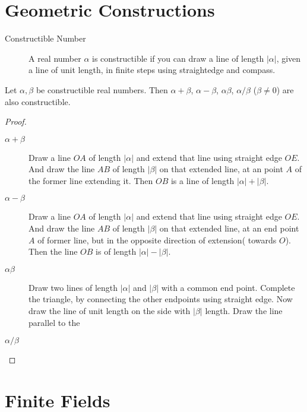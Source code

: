 \section{Geometric Constructions}
\begin{description}
	\item[Constructible Number] A real number $\alpha$ is constructible if you can draw a line of length $|\alpha|$, given a line of unit length, in finite steps using straightedge and compass.
\end{description}
\begin{theorem}
	Let $\alpha,\beta$ be constructible real numbers. Then $\alpha + \beta$, $\alpha-\beta$, $\alpha\beta$, $\alpha/\beta$ ($\beta \ne 0$) are also constructible.
\end{theorem}
\begin{proof}
	\begin{description}
		\item[$\alpha+\beta$] Draw a line $OA$ of length $|\alpha|$ and extend that line using straight edge $OE$. And draw the line $AB$ of length $|\beta|$ on that extended line, at an point $A$ of the former line extending it. Then $OB$ is a line of length $|\alpha| + |\beta|$.
		\item[$\alpha-\beta$] Draw a line $OA$ of length $|\alpha|$ and extend that line using straight edge $OE$. And draw the line $AB$ of length $|\beta|$ on that extended line, at an end point $A$ of former line, but in the opposite direction of extension( towards $O$). Then the line $OB$ is of length $|\alpha|-|\beta|$.
		\item[$\alpha\beta$] Draw two lines of length $|\alpha|$ and $|\beta|$ with a common end point. Complete the triangle, by connecting the other endpoints using straight edge. Now draw the line of unit length on the side with $|\beta|$ length. Draw the line parallel to the 
		\item[$\alpha/\beta$]
	\end{description}
\end{proof}

\section{Finite Fields}

